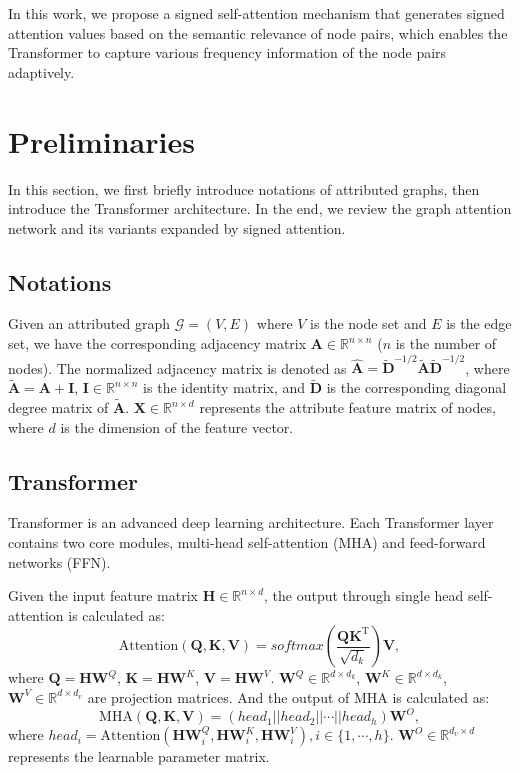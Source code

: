 \documentclass[sigconf, screen]{acmart}
\begin{document}
In this work, we propose a signed self-attention mechanism that generates signed attention values based on the semantic relevance of node pairs, which enables the Transformer to capture various frequency information of the node pairs adaptively.
 \section{Preliminaries}

In this section, we first briefly introduce notations of attributed graphs, then introduce the Transformer architecture. 
In the end, we review the graph attention network and its variants expanded by signed attention.

\subsection{Notations}
Given an attributed graph $\mathcal{G}=(V,E)$ where $V$ is the node set and $E$ is the edge set, 
we have the corresponding adjacency matrix $\mathbf{A}\in \mathbb{R}^{n\times n}$ ($n$ is the number of nodes).
The normalized adjacency matrix is denoted as  $\hat{\mathbf{A}}= \tilde{\mathbf{D}}^{-1/2}\tilde{\mathbf{A}}\tilde{\mathbf{D}}^{-1/2}$,
where $\tilde{\mathbf{A}}=\mathbf{A} + \mathbf{I}$, $\mathbf{I}\in \mathbb{R}^{n\times n}$ is the identity matrix, and $\tilde{\mathbf{D}}$ is the corresponding diagonal degree matrix of $\tilde{\mathbf{A}}$.
$\mathbf{X}\in \mathbb{R}^{n\times d}$ represents the attribute feature matrix of nodes, where $d$ is the dimension of the feature vector.

\subsection{Transformer}
Transformer is an advanced deep learning architecture. 
Each Transformer layer contains two core modules, \ie multi-head self-attention (MHA) and feed-forward networks (FFN).

Given the input feature matrix $\mathbf{H} \in \mathbb{R}^{n\times d}$, the output through single head self-attention is calculated as:
\begin{equation}
    \mathrm{Attention}(\mathbf{Q},\mathbf{K},\mathbf{V}) = \mathit{softmax}(\frac{\mathbf{Q}\mathbf{K}^{\mathrm{T}}}{\sqrt{d_k}})\mathbf{V},
    \label{sgatt}
\end{equation}
where $\mathbf{Q}=\mathbf{H}\mathbf{W}^{Q}$, 
$\mathbf{K}=\mathbf{H}\mathbf{W}^{K}$,
$\mathbf{V}=\mathbf{H}\mathbf{W}^{V}$.
$\mathbf{W}^{Q}\in \mathbb{R}^{d\times d_k}$, 
$\mathbf{W}^{K}\in \mathbb{R}^{d\times d_k}$,
$\mathbf{W}^{V}\in \mathbb{R}^{d\times d_v}$ are projection matrices.
And the output of MHA is calculated as:
\begin{equation}
    \mathrm{MHA}(\mathbf{Q},\mathbf{K},\mathbf{V}) = (head_1||head_2||\cdots||head_h)\mathbf{W}^{O},
    \label{mha}
\end{equation}
where $head_i = \mathrm{Attention}(\mathbf{H}\mathbf{W}^{Q}_{i},\mathbf{H}\mathbf{W}^{K}_{i},\mathbf{H}\mathbf{W}^{V}_{i}), i\in \{1,\cdots,h \}$.
$\mathbf{W}^{O}\in \mathbb{R}^{d_v \times d}$ represents the learnable parameter matrix.
\end{document}
